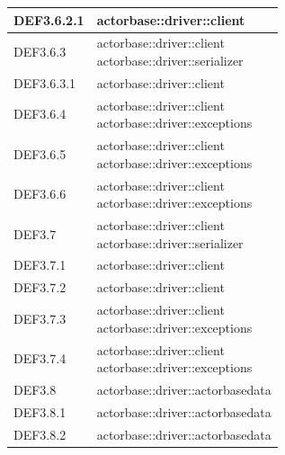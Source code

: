 \documentclass{scalatekids-article}
\begin{document}
\begin{longtable}[H]{|p{3.5cm}|p{7.5cm}|}
  \hline
  DEF3.6.2.1 & \multiLineCell[t]{actorbase::driver::client\\}\\
  \hline
  DEF3.6.3 & \multiLineCell[t]{actorbase::driver::client\\actorbase::driver::serializer\\}\\
  \hline
  DEF3.6.3.1 & \multiLineCell[t]{actorbase::driver::client\\}\\
  \hline
  DEF3.6.4 & \multiLineCell[t]{actorbase::driver::client\\actorbase::driver::exceptions\\}\\
  \hline
  DEF3.6.5 & \multiLineCell[t]{actorbase::driver::client\\actorbase::driver::exceptions\\}\\
  \hline
  DEF3.6.6 & \multiLineCell[t]{actorbase::driver::client\\actorbase::driver::exceptions\\}\\
  \hline
  DEF3.7 & \multiLineCell[t]{actorbase::driver::client\\actorbase::driver::serializer\\}\\
  \hline
  DEF3.7.1 & \multiLineCell[t]{actorbase::driver::client\\}\\
  \hline
  DEF3.7.2 & \multiLineCell[t]{actorbase::driver::client\\}\\
  \hline
  DEF3.7.3 & \multiLineCell[t]{actorbase::driver::client\\actorbase::driver::exceptions\\}\\
  \hline
  DEF3.7.4 & \multiLineCell[t]{actorbase::driver::client\\actorbase::driver::exceptions\\}\\
  \hline
  DEF3.8 & \multiLineCell[t]{actorbase::driver::actorbasedata\\}\\
  \hline
  DEF3.8.1 & \multiLineCell[t]{actorbase::driver::actorbasedata\\}\\
  \hline
  DEF3.8.2 & \multiLineCell[t]{actorbase::driver::actorbasedata\\}\\

\end{longtable}
\end{document}
